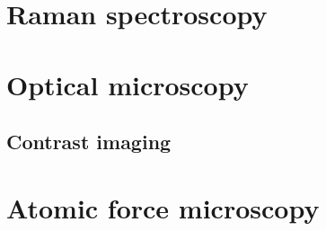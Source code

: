 \documentclass[../Matt_Gebert_Honours_Thesis.tex]{subfiles}
\begin{document}

\section{Raman spectroscopy}



\section{Optical microscopy}

\subsection{Contrast imaging}

\section{Atomic force microscopy}
\end{document}
